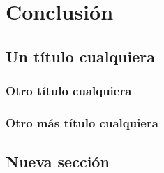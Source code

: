 
\chapter{Conclusión}
\label{ch:conclusion}

\lipsum[1]

\section{Un título cualquiera}

\lipsum[1]

\subsection{Otro título cualquiera}

\lipsum[2-4]

\subsection{Otro más título cualquiera}

\lipsum[5-6]

\section{Nueva sección}

\lipsum[1-3]

